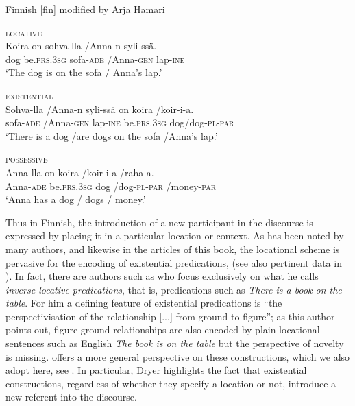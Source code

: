 \documentclass[output=paper,chinesefont,colorlinks,citecolor=brown]{langscibook}
\begin{document}
\begin{exe}
\ex Finnish [fin] \citet[113]{vilkunaPredicativePossessionClause2020} modified by Arja Hamari\label{ex:finnish-1}
\begin{xlist}
\ex \textsc{locative}\label{ex:finnish-1a}\\
\gll Koira on sohva-lla {\slash}Anna-n syli-ssä.\\
dog be.\textsc{prs.3sg} sofa-\textsc{ade} {\slash}Anna-\textsc{gen} lap-\textsc{ine}\\
\glt ‘The dog is on the sofa / Anna’s lap.’

\ex \textsc{existential}\label{ex:finnish-1b}\\
\gll Sohva-lla {\slash}Anna-n syli-ssä on koira {\slash}koir-i-a.\\
sofa-\textsc{ade} {\slash}Anna-\textsc{gen} lap-\textsc{ine} be.\textsc{prs.3sg} dog{\slash}dog-\textsc{pl}-\textsc{par}\\
\glt ‘There is a dog {\slash}are dogs  on the sofa {\slash}Anna’s lap.’

\ex \textsc{possessive}\label{ex:finnish-1c}\\
\gll Anna-lla on koira {\slash}koir-i-a {\slash}raha-a.\\
Anna-\textsc{ade} be.\textsc{prs.3sg} dog {\slash}dog-\textsc{pl}-\textsc{par} {\slash}money-\textsc{par}\\
\glt ‘Anna has a dog / dogs / money.’
\end{xlist}
\end{exe}
Thus in Finnish, the introduction of a new participant in the discourse is expressed by placing it in a particular location or context. As has been noted by many authors, and likewise in the articles of  this book, the locational scheme is pervasive for the encoding of existential predications, (see also pertinent data in ). In fact, there are authors such as \citet[1]{creissels2019} who focus exclusively on what he calls \textit{inverse-locative predications}, that is, predications such as \textit{There is a book on the table}. For him a defining feature of existential predications is “the perspectivisation of the relationship [...] from ground to figure”; as this author points out, figure-ground relationships are also encoded by plain locational sentences such as English \textit{The book is on the table} \citep[41]{creissels2019} but the perspective of novelty is missing. \citet{dryer2007a} offers a more general perspective on these constructions, which we also adopt here, see . In particular, Dryer highlights the fact that existential constructions, regardless of whether they specify a location or not, introduce a new referent into the discourse.
\end{document}
